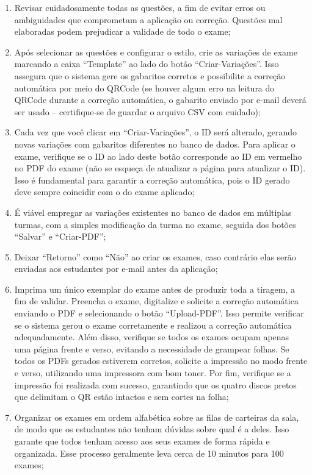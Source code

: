 \begin{enumerate}
    \item Revisar cuidadosamente todas as questões, a fim de evitar erros ou ambiguidades que comprometam a aplicação ou correção. Questões mal elaboradas podem prejudicar a validade de todo o exame;
    \item Após selecionar as questões e configurar o estilo, crie as variações de exame marcando a caixa ``Template'' ao lado do botão ``Criar-Variações''. Isso assegura que o sistema gere os gabaritos corretos e possibilite a correção automática por meio do QRCode (se houver algum erro na leitura do QRCode durante a correção automática, o gabarito enviado por e-mail deverá ser usado -- certifique-se de guardar o arquivo CSV com cuidado);
    \item Cada vez que você clicar em ``Criar-Variações'', o ID será alterado, gerando novas variações com gabaritos diferentes no banco de dados. Para aplicar o exame, verifique se o ID ao lado deste botão corresponde ao ID em vermelho no PDF do exame (não se esqueça de atualizar a página para atualizar o ID). Isso é fundamental para garantir a correção automática, pois o ID gerado deve sempre coincidir com o do exame aplicado;
    \item É viável empregar as variações existentes no banco de dados em múltiplas turmas, com a simples modificação da turma no exame, seguida dos botões ``Salvar'' e ``Criar-PDF'';
    \item Deixar ``Retorno'' como ``Não'' ao criar os exames, caso contrário elas serão enviadas aos estudantes por e-mail antes da aplicação;
    \item Imprima um único exemplar do exame antes de produzir toda a tiragem, a fim de validar. Preencha o exame, digitalize e solicite a correção automática enviando o PDF e selecionando o botão ``Upload-PDF''. Isso permite verificar se o sistema gerou o exame corretamente e realizou a correção automática adequadamente. Além disso, verifique se todos os exames ocupam apenas uma página frente e verso, evitando a necessidade de grampear folhas. Se todos os PDFs gerados estiverem corretos, solicite a impressão no modo frente e verso, utilizando uma impressora com bom toner. Por fim, verifique se a impressão foi realizada com sucesso, garantindo que os quatro discos pretos que delimitam o QR estão intactos e sem cortes na folha;
    \item Organizar os exames em ordem alfabética sobre as filas de carteiras da sala, de modo que os estudantes não tenham dúvidas sobre qual é a deles. Isso garante que todos tenham acesso aos seus exames de forma rápida e organizada. Esse processo geralmente leva cerca de 10 minutos para 100 exames;

\end{enumerate}
